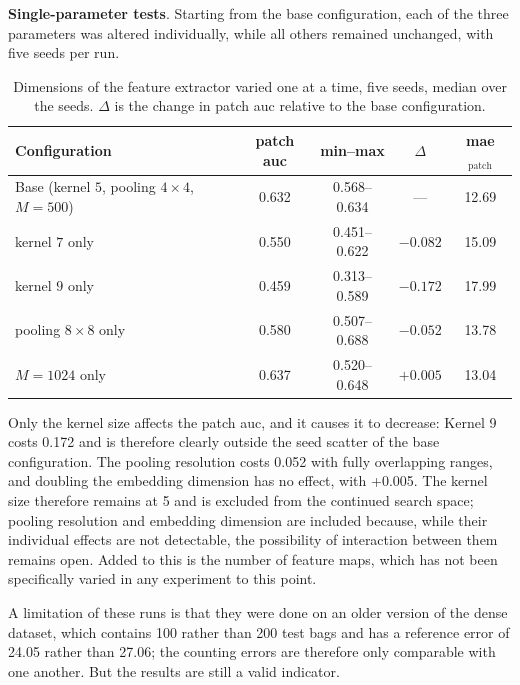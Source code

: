 \documentclass[12pt,parskip = half, DIV=classic,listof=totoc]{scrartcl}
\begin{document}
			\textbf{Single-parameter tests}. Starting from the base configuration, each of the
			three parameters was altered individually, while all others remained unchanged, with five seeds per run.
				\begin{table}[htbp]
					\centering
					\footnotesize
					\label{tab:gwhd_dims}
					\begin{tabular}{@{}lcccc@{}}
						\toprule
						Configuration & patch \acs*{auc} & min--max & $\Delta$ & \acs*{mae}$_{\text{patch}}$ \\
						\midrule
						Base (kernel $5$, pooling $4\times4$, $M=500$) & 0.632 & 0.568--0.634 & --- & 12.69 \\
						kernel $7$ only          & 0.550 & 0.451--0.622 & $-0.082$ & 15.09 \\
						kernel $9$ only          & 0.459 & 0.313--0.589 & $\mathbf{-0.172}$ & 17.99 \\
						pooling $8\times8$ only  & 0.580 & 0.507--0.688 & $-0.052$ & 13.78 \\
						$M=1024$ only            & 0.637 & 0.520--0.648 & $\mathbf{+0.005}$ & 13.04 \\
						\bottomrule
					\end{tabular}
					\caption[Dimensions of the feature extractor varied one at a time, five seeds, median over the seeds]{Dimensions of the feature extractor varied one at a time, five seeds, median over the
					seeds. $\Delta$ is the change in patch \ac{auc} relative to the base configuration.}
				\end{table}

			Only the kernel size affects the patch \ac{auc}, and it causes it to decrease: Kernel 9 costs 0.172 and is therefore clearly outside the seed scatter of the
			base configuration. The pooling resolution costs 0.052 with fully overlapping ranges, and doubling the embedding dimension has no effect, with
			+0.005. The kernel size therefore remains at 5 and is excluded from the continued search space; pooling resolution and embedding dimension 
			are included because, while their individual effects are not detectable, the possibility of interaction between them remains open.
			Added to this is the number of feature maps, which has not been specifically varied in any experiment to this point.
			
			A limitation of these runs is that they were done on an older version of the dense
			dataset, which contains 100 rather than 200 test bags and has a reference error of 24.05 rather than
			27.06; the counting errors are therefore only comparable with one another. But the results are still a valid indicator.
			
\end{document}
